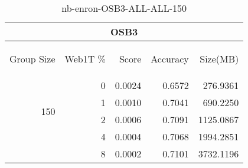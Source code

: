 \begin{center}
\begin{table}[htbp] 
 \begin{center}
\begin{tabular}{ | r | r | r | r | r |}
\hline
\multicolumn{5}{|c|}{OSB3}\\
\hline
\begin{sideways}Group Size\end{sideways} & \begin{sideways}Web1T \%\end{sideways} & \begin{sideways}Score\end{sideways} & \begin{sideways}Accuracy\end{sideways} & \begin{sideways}Size(MB)\end{sideways}\\
\hline
\multirow{4}{*}{150}
 & 0 & 0.0024 & 0.6572 & 276.9361\\ \cline{2-5}
 & 1 & 0.0010 & 0.7041 & 690.2250\\ \cline{2-5}
 & 2 & 0.0006 & 0.7091 & 1125.0867\\ \cline{2-5}
 & 4 & 0.0004 & 0.7068 & 1994.2851\\ \cline{2-5}
 & 8 & 0.0002 & 0.7101 & 3732.1196\\ \cline{2-5}
\hline
\end{tabular}
\caption{nb-enron-OSB3-ALL-ALL-150}
\label{table:nb-enron-OSB3-ALL-ALL-150}
\end{center}
 \end{table}
\end{center}


